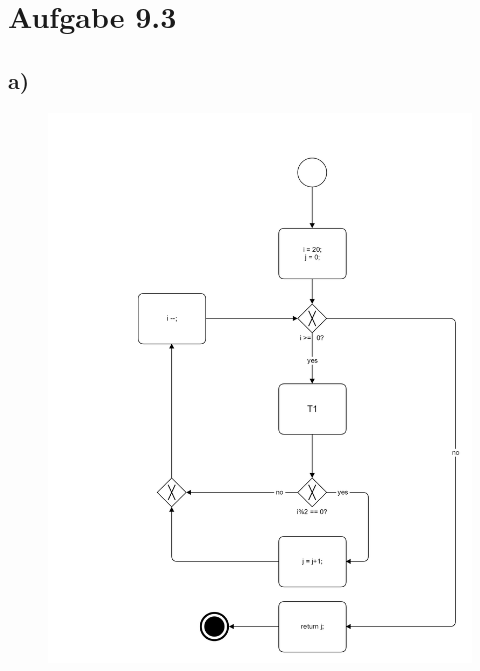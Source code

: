 \documentclass{article}
\begin{document}
	\pagebreak
	
	
	\section*{Aufgabe 9.3}
		\subsection*{a)}
			\begin{figure}[h!]
				\includegraphics[scale=0.2]{aufgabe_9_3_a.jpg}
			\end{figure}
		
	\pagebreak
	
\end{document}
